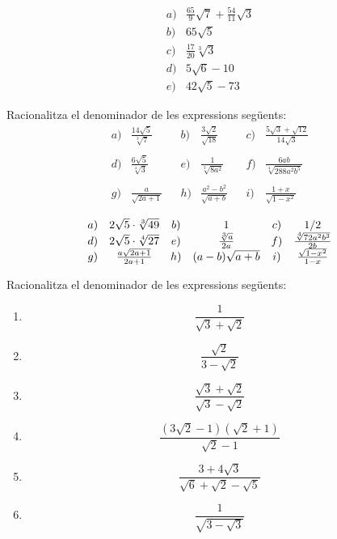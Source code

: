 \begin{indicacio}
%
\[
\begin{array}{ll}
a) & \frac{65}{9}\sqrt{7}+\frac{54}{11}\sqrt{3} \\ 
b) & 65\sqrt{5} \\ 
c) & \frac{17}{20}\sqrt[3]{3} \\ 
d) & 5\sqrt{6}-10 \\ 
e) & 42\sqrt{5}-73%
\end{array}%
\]
\end{indicacio}

\begin{exercici}
Racionalitza el denominador de les expressions següents:%
\[
\begin{array}{llllllll}
a) & \frac{14\sqrt{5}}{\sqrt[3]{7}} &  & b) & \frac{3\sqrt{2}}{\sqrt{18}} & 
& c) & \frac{5\sqrt{3}+\sqrt{12}}{14\sqrt{3}} \\ 
&  &  &  &  &  &  &  \\ 
d) & \frac{6\sqrt{5}}{\sqrt[4]{3}} &  & e) & \frac{1}{\sqrt[3]{8a^{2}}} &  & 
f) & \frac{6ab}{\sqrt[4]{288a^{2}b^{5}}} \\ 
&  &  &  &  &  &  &  \\ 
g) & \frac{a}{\sqrt{2a+1}} &  & h) & \frac{a^{2}-b^{2}}{\sqrt{a+b}} &  & i)
& \frac{1+x}{\sqrt{1-x^{2}}}%
\end{array}%
\]

\end{exercici}

\begin{indicacio}
%
\[
\begin{array}{cccccc}
a) & 2\sqrt{5}\cdot \sqrt[3]{49} & b) & 1 & c) & 1/2 \\ 
d) & 2\sqrt{5}\cdot \sqrt[4]{27} & e) & \frac{\sqrt[3]{a}}{2a} & f) & \frac{%
\sqrt[4]{72a^{2}b^{3}}}{2b} \\ 
g) & \frac{a\sqrt{2a+1}}{2a+1} & h) & (a-b)\sqrt{a+b} & i) & \frac{\sqrt{%
1-x^{2}}}{1-x}%
\end{array}%
\]
\end{indicacio}

\begin{exercici}
Racionalitza el denominador de les expressions següents:

\begin{enumerate}
\item[a)] 
\[
\frac{1}{\sqrt{3}+\sqrt{2}} 
\]

\item[b)] 
\[
\frac{\sqrt{2}}{3-\sqrt{2}} 
\]

\item[c)] 
\[
\frac{\sqrt{3}+\sqrt{2}}{\sqrt{3}-\sqrt{2}} 
\]

\item[d)] 
\[
\frac{(3\sqrt{2}-1)(\sqrt{2}+1)}{\sqrt{2}-1} 
\]

\item[e)] 
\[
\frac{3+4\sqrt{3}}{\sqrt{6}+\sqrt{2}-\sqrt{5}} 
\]

\item[f)] 
\[
\frac{1}{\sqrt{3-\sqrt{3}}} 
\]
\end{enumerate}

\end{exercici}

